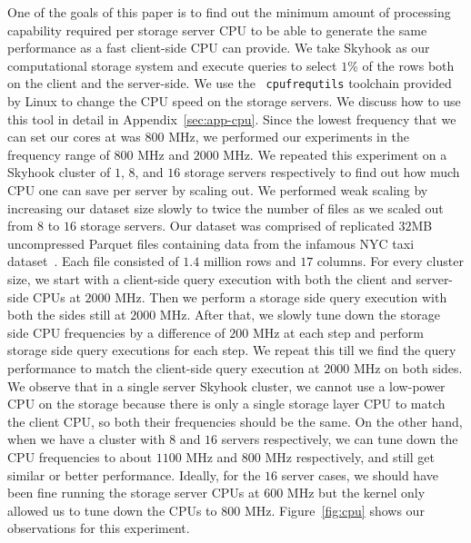 \documentclass[11pt]{article}
\newcommand{\code}[1]{\colorbox{light-gray}{\texttt{#1}}}
\begin{document}
One of the goals of this paper is to find out the minimum amount of processing capability required per storage server CPU to be able to generate the same performance as a fast client-side CPU can provide. We take Skyhook as our computational storage system and execute queries to select $1$\% of the rows both on the client and the server-side. We use the ~\code{cpufrequtils} toolchain provided by Linux to change the CPU speed on the storage servers. We discuss how to use this tool in detail in Appendix~\ref{sec:app-cpu}. Since the lowest frequency that we can set our cores at was $800$ MHz, we performed our experiments in the frequency range of $800$ MHz and $2000$ MHz. We repeated this experiment on a Skyhook cluster of $1$, $8$, and $16$ storage servers respectively to find out how much CPU one can save per server by scaling out. We performed weak scaling by increasing our dataset size slowly to twice the number of files as we scaled out from $8$ to $16$ storage servers. Our dataset was comprised of replicated $32$MB uncompressed Parquet files containing data from the infamous NYC taxi dataset~\cite{yellowtaxi}. Each file consisted of $1.4$ million rows and $17$ columns. For every cluster size, we start with a client-side query execution with both the client and server-side CPUs at $2000$ MHz. Then we perform a storage side query execution with both the sides still at $2000$ MHz. After that, we slowly tune down the storage side CPU frequencies by a difference of $200$ MHz at each step and perform storage side query executions for each step. We repeat this till we find the query performance to match the client-side query execution at $2000$ MHz on both sides. We observe that in a single server Skyhook cluster, we cannot use a low-power CPU on the storage because there is only a single storage layer CPU to match the client CPU, so both their frequencies should be the same. On the other hand, when we have a cluster with $8$ and $16$ servers respectively, we can tune down the CPU frequencies to about $1100$ MHz and $800$ MHz respectively, and still get similar or better performance. Ideally, for the $16$ server cases, we should have been fine running the storage server CPUs at $600$ MHz but the kernel only allowed us to tune down the CPUs to $800$ MHz. Figure~\ref{fig:cpu} shows our observations for this experiment.
\end{document}
